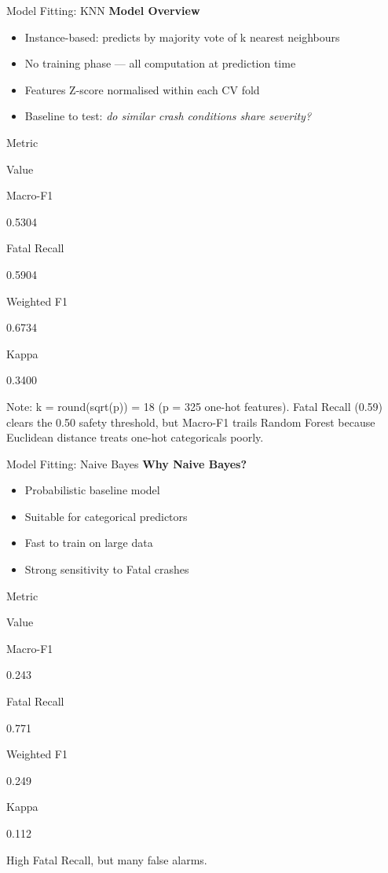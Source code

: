 \documentclass[
  ignorenonframetext,
]{beamer}
\begin{document}
\begin{frame}{Model Fitting: KNN}
\label{model-fitting-knn}
\textbf{Model Overview}

\begin{itemize}
\item
  Instance-based: predicts by majority vote of k nearest neighbours
\item
  No training phase --- all computation at prediction time
\item
  Features Z-score normalised within each CV fold
\item
  Baseline to test: \emph{do similar crash conditions share severity?}
\end{itemize}

Metric

Value

Macro-F1

0.5304

Fatal Recall

0.5904

Weighted F1

0.6734

Kappa

0.3400

Note: k = round(sqrt(p)) = 18 (p = 325 one-hot features). Fatal Recall
(0.59) clears the 0.50 safety threshold, but Macro-F1 trails Random
Forest because Euclidean distance treats one-hot categoricals poorly.
\end{frame}

\begin{frame}{Model Fitting: Naive Bayes}
\label{model-fitting-naive-bayes}
\textbf{Why Naive Bayes?}

\begin{itemize}
\item
  Probabilistic baseline model
\item
  Suitable for categorical predictors
\item
  Fast to train on large data
\item
  Strong sensitivity to Fatal crashes
\end{itemize}

Metric

Value

Macro-F1

0.243

Fatal Recall

0.771

Weighted F1

0.249

Kappa

0.112

High Fatal Recall, but many false alarms.
\end{frame}
\end{document}

